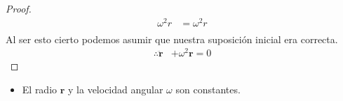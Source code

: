 \documentclass{article}
\begin{document}
\begin{enumerate}
\begin{proof}
\begin{equation*}
\begin{split}
            \omega^2r&=\omega^2r\\
        \end{split}
    \end{equation*}
    Al ser esto cierto podemos asumir que nuestra suposición inicial era correcta.
    \begin{equation*}
        \begin{split}
            \therefore \pmb{\ddot{r}}&+\omega^2 \pmb{r}=0
        \end{split}
    \end{equation*}
    \end{proof}
    \begin{itemize}
        \item El radio $\pmb{r}$ y la velocidad angular $\omega$ son constantes.
    \end{itemize}
\end{enumerate}
\end{document}
